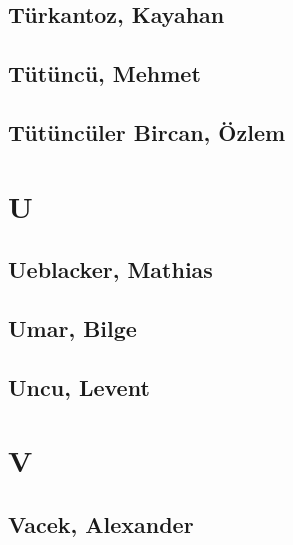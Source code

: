 \subsection[Türkantoz, Kayahan (1)]{Türkantoz, Kayahan}

\subsection[Tütüncü, Mehmet (1)]{Tütüncü, Mehmet}

\subsection[Tütüncüler Bircan, Özlem (1)]{Tütüncüler Bircan, Özlem}

\section{U}

\subsection[Ueblacker, Mathias (2)]{Ueblacker, Mathias}


\subsection[Umar, Bilge (1)]{Umar, Bilge}

\subsection[Uncu, Levent (1)]{Uncu, Levent}

\section{V}

\subsection[Vacek, Alexander (1)]{Vacek, Alexander}

